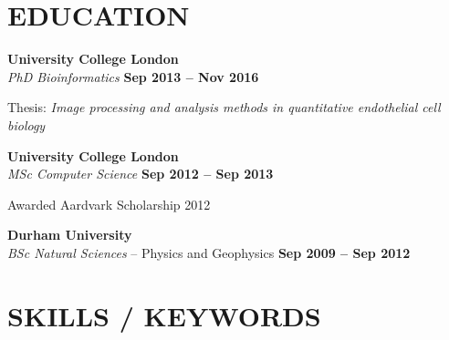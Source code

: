 \documentclass[margin,line]{resume}
\begin{document}
\begin{resume}
    \section{\mysidestyle \textbf{\large{E}\small{DUCATION}}}

    \vspace{1mm}

    \textbf{\listing University College London} \vspace{1mm}\\
    \textsl{PhD Bioinformatics} \hfill \textbf{Sep 2013 -- Nov 2016}\vspace{-3mm}\\\vspace{-1mm}%
    \begin{list2}
        \item[\ding{212}] Thesis: \emph{Image processing and analysis methods in quantitative endothelial cell biology}
    \end{list2}\vspace{-1.5mm}

    \textbf{\listing University College London} \vspace{1mm}\\
    \textsl{MSc Computer Science} \hfill \textbf{Sep 2012 -- Sep 2013}\vspace{-3mm}\\\vspace{-1mm}%
    \begin{list2}
        \item[\ding{212}] Awarded Aardvark Scholarship 2012
    \end{list2}\vspace{-1.5mm}

    \textbf{\listing Durham University} \vspace{1mm}\\
    \textsl{BSc Natural Sciences} -- Physics and Geophysics \hfill \textbf{Sep 2009 -- Sep 2012}\vspace{-3mm}\\\vspace{-1mm}%

    \vspace{-1mm}

\sectionline

    \section{\mysidestyle \textbf{\large{S}\small{KILLS} / \large{K}\small{EYWORDS}}}


\end{resume}
\end{document}
